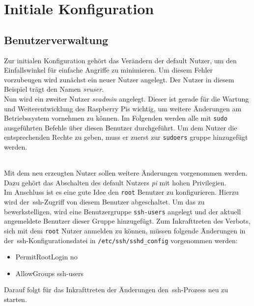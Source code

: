 
\section{Initiale Konfiguration}\label{sec:initiale-konfiguration}
\subsection{Benutzerverwaltung}\label{subsec: benutzerverwaltung}
Zur initialen Konfiguration gehört das Verändern der default Nutzer, um den Einfallswinkel für einfache Angriffe zu minimieren.
Um diesem Fehler vorzubeugen wird zunächst ein neuer Nutzer angelegt.
Der Nutzer in diesem Beispiel trägt den Namen \textit{svuser}. \\

Nun wird ein zweiter Nutzer \textit{svadmin} angelegt.
Dieser ist gerade für die Wartung und Weiterentwicklung des Raspberry Pis wichtig, um weitere Änderungen am Betriebssystem vornehmen zu können.
Im Folgenden werden alle mit \texttt{sudo} ausgeführten Befehle über diesen Benutzer durchgeführt.
Um dem Nutzer die entsprechenden Rechte zu geben, muss er zuerst zur \texttt{sudoers} gruppe hinzugefügt werden.

\\
\blankline
Mit dem neu erzeugten Nutzer sollen weitere Änderungen vorgenommen werden.
Dazu gehört das Abschalten des default Nutzers \textit{pi} mit hohen Privilegien. \\

\blankline
Im Anschluss ist es eine gute Idee den \texttt{root} Benutzer zu konfigurieren.
Hierzu wird der~\gls{ssh}-Zugriff von diesem Benutzer abgeschaltet.
Um das zu bewerkstelligen, wird eine Benutzergruppe \texttt{ssh-users} angelegt und der aktuell angemeldete Benutzer dieser Gruppe hinzugefügt.
Zum Inkrafttreten des Verbots, sich mit dem \texttt{root} Nutzer anmelden zu können, müssen folgende Änderungen in der~\gls{ssh}-Konfigurationsdatei in \texttt{/etc/ssh/sshd\_config}\label{ssh-config-file} vorgenommen werden:
\begin{itemize}
    \item PermitRootLogin no
    \item AllowGroups ssh-users
\end{itemize}

Darauf folgt für das Inkrafttreten der Änderungen den~\gls{ssh}-Prozess neu zu starten.


